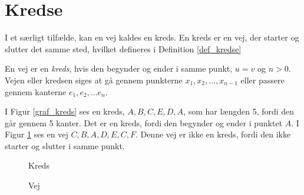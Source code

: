 \section{Kredse}
I et særligt tilfælde, kan en vej kaldes en kreds.
En kreds er en vej, der starter og slutter det samme sted, hvilket defineres i Definition \ref{def_kredse}

\begin{defn}
\label{def_kredse}
En vej er en \textit{kreds}, hvis den begynder og ender i samme punkt, $u=v$ og $n>0$.
Vejen eller kredsen siges at gå gennem punkterne $x_1,x_2,...,x_{n-1}$ eller passere gennem kanterne $e_1, e_2,...e_n$.
\end{defn}

\begin{exmp}
I Figur \ref{graf_kreds} ses en kreds, $A,B,C,E,D,A$, som har længden 5, fordi den går gennem 5 kanter. Det er en kreds, fordi den begynder og ender i punktet $A$.
I Figur \ref{graf_ikke_kreds} ses en vej $C,B,A,D,E,C,F$.
Denne vej er ikke en kreds, fordi den ikke starter og slutter i samme punkt. 
\end{exmp}

\begin{figure}[!htb]
   \begin{minipage}{0.48\textwidth}
     \centering
     \caption{Kreds}
     \label{graf_kreds}
   \end{minipage}\hfill
   \begin{minipage}{0.48\textwidth}
     \centering
     \caption{Vej}
     \label{graf_ikke_kreds}
   \end{minipage}
\end{figure}

